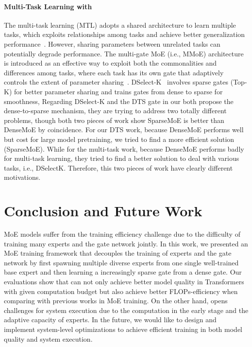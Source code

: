 \paragraph{Multi-Task Learning with \moe{}} 
The multi-task learning (MTL) adopts a shared architecture to learn multiple tasks, which exploits relationships among tasks and achieve better generalization performance~\cite{DBLP:journals/corr/mtl_overview}. However, sharing parameters between unrelated tasks can potentially degrade performance.
The multi-gate MoE (i.e., MMoE) architecture is introduced as an effective way to exploit both the commonalities and differences among tasks, where each task has its own gate that adaptively controls the extent of parameter sharing~\cite{ DBLP:conf/kdd/mmoe}. 
DSelect-K~\cite{DBLP:conf/nips/dselectk} involves sparse gates (Top-K) for better parameter sharing and trains gates from dense to sparse for smoothness,
Regarding DSelect-K and the DTS gate in our \evomoe{} both propose the dense-to-sparse mechanism, they are trying to address two totally different problems, though both two pieces of work show SparseMoE is better than DenseMoE by coincidence.
For our DTS work, because DenseMoE performs well but cost for large model pretraining, we tried to find a more efficient solution (SparseMoE). While for the multi-task work, because DenseMoE performs badly for multi-task learning, they tried to find a better solution to deal with various tasks, i.e., DSelectK. Therefore, this two pieces of work have clearly different motivations.

\section{Conclusion and Future Work}
\label{sec:conclusion}
MoE models suffer from the training efficiency challenge due to the difficulty of training many experts and the gate network jointly. 
In this work, we presented an MoE training framework \evomoe that decouples the training of experts and the gate network by first spawning multiple diverse experts from one single well-trained base expert and then learning a increasingly sparse gate from a dense gate.
Our evaluations show that \evomoe can not only achieve better model quality in Transformers with given computation budget but also achieve better FLOPs-efficiency when comparing with previous works in MoE training. 
On the other hand, \evomoe opens challenges for system execution due to the computation in the early stage and the adaptive capacity of experts. 
In the future, we would like to design and implement system-level optimizations to achieve efficient training in both model quality and system execution.

\balance

